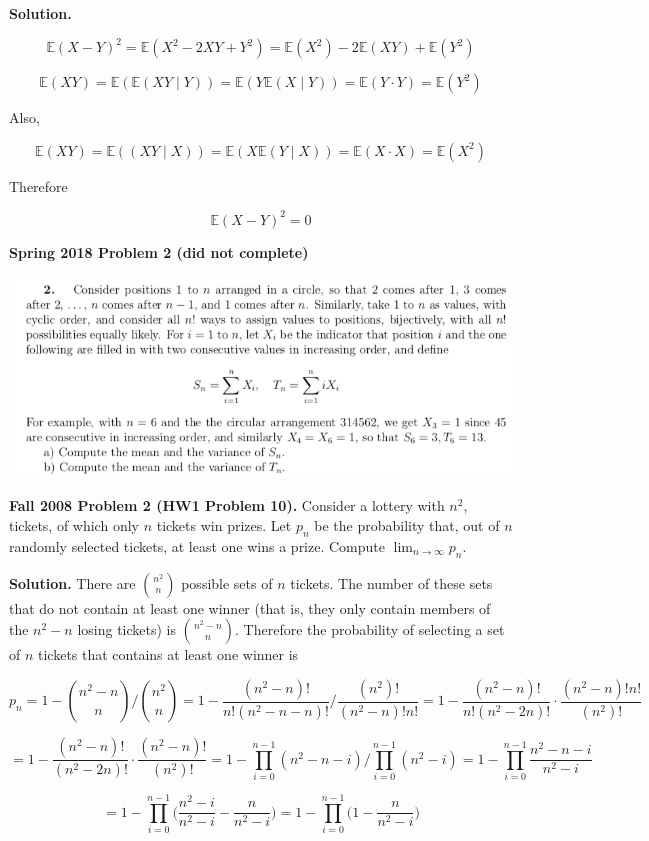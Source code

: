 \documentclass{article}
\newcommand{\E}{\mathbb{E}}
\begin{document}
\textbf{Solution.} 

\[
\E(X-Y)^2 = \E(X^2 - 2XY + Y^2) = \E(X^2) - 2 \E(XY) + \E(Y^2)
\]

\[
\E(XY) = \E( \E(XY\mid Y)) = \E(Y\E(X\mid Y)) = \E(Y \cdot Y) = \E(Y^2)
\]

Also,

\[
\E(XY) = \E((XY \mid X)) = \E(X \E(Y \mid X)) = \E( X \cdot X) = \E(X^2)
\]

Therefore

\[
\E(X-Y)^2 =0
\]


\textbf{Spring 2018 Problem 2 (did not complete)}

\includegraphics[scale=0.6]{prob_sp18p2}

\textbf{Fall 2008 Problem 2 (HW1 Problem 10).} Consider a lottery with \(n^2\), tickets, of which only \(n\) tickets win prizes. Let \(p_n\) be the probability that, out of \(n\) randomly selected tickets, at least one wins a prize. Compute \(\lim_{n \to \infty} p_n\).

\textbf{Solution.} There are \(\binom{n^2}{n}\) possible sets of \(n\) tickets. The number of these sets that do not contain at least one winner (that is, they only contain members of the \(n^2 - n\) losing tickets) is \(\binom{n^2 - n}{n}\). Therefore the probability of selecting a set of \(n\) tickets that contains at least one winner is

\[
p_n = 1 - \binom{n^2 - n}{n} \bigg/ \binom{n^2}{n} = 1 - \frac{(n^2 - n)!}{n!(n^2 - n - n)!} \bigg/ \frac{(n^2)!}{(n^2 - n)!n!} = 1 - \frac{(n^2 - n)!}{n!(n^2 - 2n)!} \cdot \frac{(n^2 - n)!n!}{(n^2)!}
\]

\[
 = 1 - \frac{(n^2 - n)!}{(n^2 - 2n)!} \cdot \frac{(n^2 - n)!}{(n^2)!} = 1 - \prod_{i=0}^{n-1}(n^2 - n - i)  \bigg/ \prod_{i=0}^{n-1}(n^2 - i) = 1 - \prod_{i=0}^{n-1} \frac{n^2 - n - i}{n^2 - i}
\]

\[
= 1 - \prod_{i=0}^{n-1}\bigg( \frac{n^2 - i}{n^2 - i} -\frac{n}{n^2 - i} \bigg) = 1 - \prod_{i=0}^{n-1}\bigg(1-\frac{n}{n^2 - i} \bigg)
\]
\end{document}
